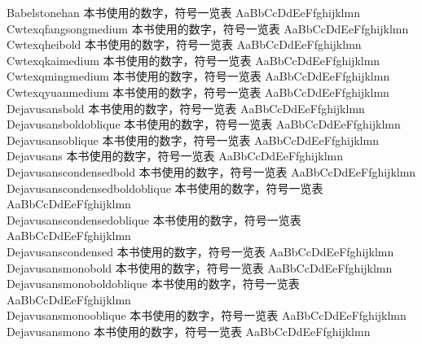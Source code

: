 Babelstonehan {\cjk\mktsFontfileBabelstonehan{}本书使用的数字，符号一览表 AaBbCcDdEeFfghijklmn}\\
Cwtexqfangsongmedium {\cjk\mktsFontfileCwtexqfangsongmedium{}本书使用的数字，符号一览表 AaBbCcDdEeFfghijklmn}\\
Cwtexqheibold {\cjk\mktsFontfileCwtexqheibold{}本书使用的数字，符号一览表 AaBbCcDdEeFfghijklmn}\\
Cwtexqkaimedium {\cjk\mktsFontfileCwtexqkaimedium{}本书使用的数字，符号一览表 AaBbCcDdEeFfghijklmn}\\
Cwtexqmingmedium {\cjk\mktsFontfileCwtexqmingmedium{}本书使用的数字，符号一览表 AaBbCcDdEeFfghijklmn}\\
Cwtexqyuanmedium {\cjk\mktsFontfileCwtexqyuanmedium{}本书使用的数字，符号一览表 AaBbCcDdEeFfghijklmn}\\
Dejavusansbold {\cjk\mktsFontfileDejavusansbold{}本书使用的数字，符号一览表 AaBbCcDdEeFfghijklmn}\\
Dejavusansboldoblique {\cjk\mktsFontfileDejavusansboldoblique{}本书使用的数字，符号一览表 AaBbCcDdEeFfghijklmn}\\
Dejavusansoblique {\cjk\mktsFontfileDejavusansoblique{}本书使用的数字，符号一览表 AaBbCcDdEeFfghijklmn}\\
Dejavusans {\cjk\mktsFontfileDejavusans{}本书使用的数字，符号一览表 AaBbCcDdEeFfghijklmn}\\
Dejavusanscondensedbold {\cjk\mktsFontfileDejavusanscondensedbold{}本书使用的数字，符号一览表 AaBbCcDdEeFfghijklmn}\\
Dejavusanscondensedboldoblique {\cjk\mktsFontfileDejavusanscondensedboldoblique{}本书使用的数字，符号一览表 AaBbCcDdEeFfghijklmn}\\
Dejavusanscondensedoblique {\cjk\mktsFontfileDejavusanscondensedoblique{}本书使用的数字，符号一览表 AaBbCcDdEeFfghijklmn}\\
Dejavusanscondensed {\cjk\mktsFontfileDejavusanscondensed{}本书使用的数字，符号一览表 AaBbCcDdEeFfghijklmn}\\
Dejavusansmonobold {\cjk\mktsFontfileDejavusansmonobold{}本书使用的数字，符号一览表 AaBbCcDdEeFfghijklmn}\\
Dejavusansmonoboldoblique {\cjk\mktsFontfileDejavusansmonoboldoblique{}本书使用的数字，符号一览表 AaBbCcDdEeFfghijklmn}\\
Dejavusansmonooblique {\cjk\mktsFontfileDejavusansmonooblique{}本书使用的数字，符号一览表 AaBbCcDdEeFfghijklmn}\\
Dejavusansmono {\cjk\mktsFontfileDejavusansmono{}本书使用的数字，符号一览表 AaBbCcDdEeFfghijklmn}\\
